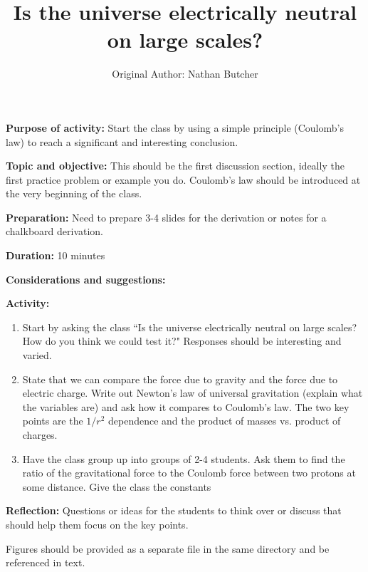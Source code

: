\documentclass{article}
\title{Is the universe electrically neutral on large scales?}
\author{Original Author: Nathan Butcher}
\date{}
\begin{document}
\maketitle
\thispagestyle{empty}

\textbf{Purpose of activity:} Start the class by using a simple principle (Coulomb's law) to reach a significant and interesting conclusion.

\textbf{Topic and objective:} This should be the first discussion section, ideally the first practice problem or example you do. Coulomb's law should be introduced at the very beginning of the class.

\textbf{Preparation:} Need to prepare 3-4 slides for the derivation or notes for a chalkboard derivation.

\textbf{Duration:} 10 minutes 

\textbf{Considerations and suggestions:}

\hspace{14pt}

\textbf{Activity:}
\begin{enumerate}
\item Start by asking the class ``Is the universe electrically neutral on large scales? How do you think we could test it?" Responses should be interesting and varied.
\item State that we can compare the force due to gravity and the force due to electric charge. Write out Newton's law of universal gravitation (explain what the variables are) and ask how it compares to Coulomb's law. The two key points are the $1/r^2$ dependence and the product of masses vs. product of charges.
\item Have the class group up into groups of 2-4 students. Ask them to find the ratio of the gravitational force to the Coulomb force between two protons at some distance. Give the class the constants
\end{enumerate}

\textbf{Reflection:} Questions or ideas for the students to think over or discuss that should help them focus on the key points.

\hspace{14pt}

Figures should be provided as a separate file in the same directory and be referenced in text.
\end{document}
